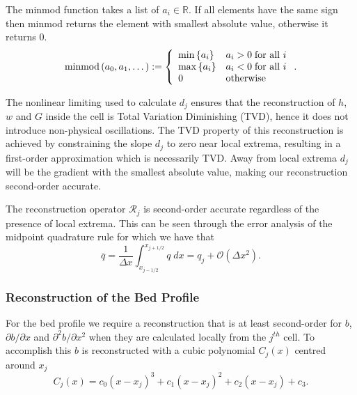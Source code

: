 \begin{defn}
The minmod function takes a list of $a_i \in \mathbb{R}$. If all elements have the same sign then minmod returns the element with smallest absolute value, otherwise it returns $0$. 
	\begin{equation*}
	\text{minmod}\left(a_0,a_1,\dots\right) := \left\lbrace \begin{array}{l l}
	\min\left\lbrace a_i\right\rbrace & a_i > 0 \; \text{for all } i \\
	\max\left\lbrace a_i\right\rbrace & a_i < 0  \; \text{for all } i \\
	0 & \text{otherwise}\\
	\end{array} \right. . 
	\end{equation*}
\end{defn}
The nonlinear limiting used to calculate $d_j$ ensures that the reconstruction of $h$, $w$ and $G$ inside the cell is Total Variation Diminishing (TVD), hence it does not introduce non-physical oscillations. The TVD property of this reconstruction is achieved by constraining the slope $d_j$ to zero near local extrema, resulting in a first-order approximation which is necessarily TVD. Away from local extrema $d_j$ will be the gradient with the smallest absolute value, making our reconstruction second-order accurate.

The reconstruction operator $\mathcal{R}_{j} $ is second-order accurate regardless of the presence of local extrema. This can be seen through the error analysis of the midpoint quadrature rule \cite{Davis-Rabinowitz-1984} for which we have that
\begin{equation}
\overline{q} = \frac{1}{\Delta x} \int_{x_{j-1/2}}^{x_{j+1/2}} q \; dx = q_j + \mathcal{O}\left(\Delta x^2\right).
\end{equation}

\subsubsection{Reconstruction of the Bed Profile}
For the bed profile we require a reconstruction that is at least second-order for $b$, $\partial b / \partial x$ and $\partial^2 b / \partial x^2$ when they are calculated locally from the $j^{th}$ cell. To accomplish this $b$ is reconstructed with a cubic polynomial $C_j(x)$ centred around $x_j$
\begin{equation}
C_j(x) = c_0 \left(x - x_j\right)^3 + c_1 \left(x - x_j\right)^2 + c_2 \left(x - x_j\right) + c_3.
\label{eqn:cubicforbedrecon}
\end{equation}

